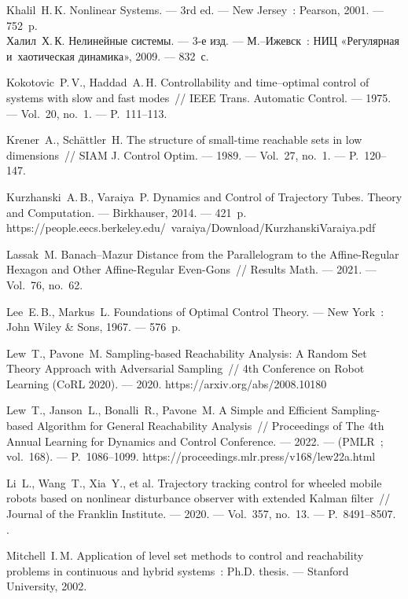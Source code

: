 \documentclass[../main.tex]{subfiles}
\begin{document}
\begin{thebibliography}{99}
Khalil~H.\,K. Nonlinear Systems. --- 3rd ed. --- New Jersey~: Pearson, 2001. --- 752~p.
\\
Халил~Х.\,К. Нелинейные системы. --- 3-е изд. --- М.--Ижевск~: НИЦ «Регулярная и~хаотическая динамика», 2009. --- 832~с.


Kokotovic~P.\,V., Haddad~A.\,H. Controllability and time–optimal control of systems with slow and fast modes~// IEEE Trans. Automatic Control. --- 1975. --- Vol.~20, no.~1. --- P.~111--113.


Krener~A., Sch\"{a}ttler~H. The structure of small-time reachable sets in low dimensions~// SIAM J. Control Optim. --- 1989. --- Vol.~27, no.~1. --- P.~120--147. 

Kurzhanski~A.\,B., Varaiya~P. Dynamics and Control of Trajectory Tubes. Theory and Computation. --- Birkhauser, 2014. --- 421~p.\\ https://people.eecs.berkeley.edu/~varaiya/Download/KurzhanskiVaraiya.pdf

Lassak~M. Banach–Mazur Distance from the Parallelogram to the Affine-Regular Hexagon and Other Affine-Regular Even-Gons~// Results Math. --- 2021. --- Vol.~76, no.~62. 

Lee~E.\,B., Markus~L. Foundations of Optimal Control Theory. --- New York~: John Wiley \& Sons, 1967. --- 576~p.

Lew~T., Pavone~M. Sampling-based Reachability Analysis: A Random Set Theory Approach with Adversarial Sampling~// 4th Conference on Robot Learning (CoRL 2020). --- 2020.
https://arxiv.org/abs/2008.10180

Lew~T., Janson~L., Bonalli~R., Pavone~M. A Simple and Efficient Sampling-based Algorithm for General Reachability Analysis~// Proceedings of The 4th Annual Learning for Dynamics and Control Conference. --- 2022. --- (PMLR~; vol.~168). --- P.~1086--1099. https://proceedings.mlr.press/v168/lew22a.html

Li~L., Wang~T., Xia~Y., et al. Trajectory tracking control for wheeled mobile robots based on nonlinear disturbance observer with extended Kalman filter~// Journal of the Franklin Institute. --- 2020. --- Vol.~357, no.~13. --- P.~8491--8507.
 .

Mitchell~I.\,M. Application of level set methods to control and reachability problems in continuous and hybrid systems~: Ph.D. thesis. --- Stanford University, 2002.


\end{thebibliography}
\end{document}
